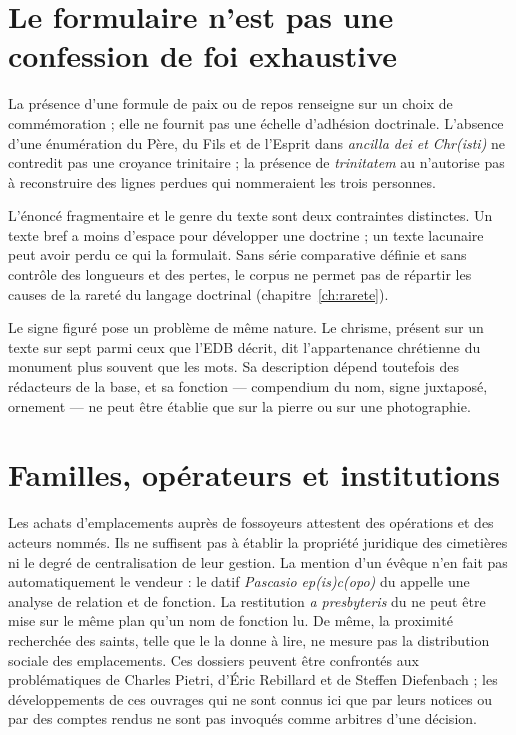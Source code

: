 \section{Le formulaire n’est pas une confession de foi exhaustive}

La présence d’une formule de paix ou de repos renseigne sur un choix de commémoration ; elle ne fournit pas une échelle d’adhésion doctrinale. L’absence d’une énumération du Père, du Fils et de l’Esprit dans \emph{ancilla dei et Chr(isti)} ne contredit pas une croyance trinitaire ; la présence de \emph{trinitatem} au  n’autorise pas à reconstruire des lignes perdues qui nommeraient les trois personnes.

L’énoncé fragmentaire et le genre du texte sont deux contraintes distinctes. Un texte bref a moins d’espace pour développer une doctrine ; un texte lacunaire peut avoir perdu ce qui la formulait. Sans série comparative définie et sans contrôle des longueurs et des pertes, le corpus ne permet pas de répartir les causes de la rareté du langage doctrinal (chapitre~\ref{ch:rarete}).

Le signe figuré pose un problème de même nature. Le chrisme, présent sur un texte sur sept parmi ceux que l’EDB décrit, dit l’appartenance chrétienne du monument plus souvent que les mots. Sa description dépend toutefois des rédacteurs de la base, et sa fonction — compendium du nom, signe juxtaposé, ornement — ne peut être établie que sur la pierre ou sur une photographie.

\section{Familles, opérateurs et institutions}

Les achats d’emplacements auprès de fossoyeurs attestent des opérations et des acteurs nommés. Ils ne suffisent pas à établir la propriété juridique des cimetières ni le degré de centralisation de leur gestion. La mention d’un évêque n’en fait pas automatiquement le vendeur : le datif \emph{Pascasio ep(is)c(opo)} du  appelle une analyse de relation et de fonction. La restitution \emph{a presbyteris} du  ne peut être mise sur le même plan qu’un nom de fonction lu. De même, la proximité recherchée des saints, telle que le  la donne à lire, ne mesure pas la distribution sociale des emplacements. Ces dossiers peuvent être confrontés aux problématiques de Charles Pietri, d’Éric Rebillard et de Steffen Diefenbach ; les développements de ces ouvrages qui ne sont connus ici que par leurs notices ou par des comptes rendus ne sont pas invoqués comme arbitres d’une décision.

